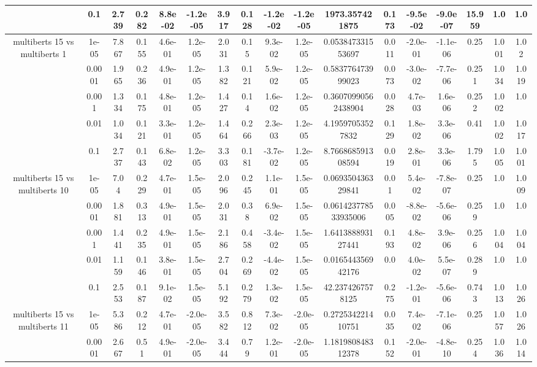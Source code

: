 \begin{tabular}{|c|c|c|c|c|c|c|c|c|c|c|c|c|c|c|c|c|}
 & 0.1 & 2.739 & 0.282 & 8.8e-02 & -1.2e-05 & 3.917 & 0.128 & -1.2e-02 & -1.2e-05 & 1973.357421875 & 0.173 & -9.5e-02 & -9.0e-07 & 15.959 & 1.0 & 1.0 \\
\hline
\multirow{5}{*}{multiberts 15 vs multiberts 1} & 1e-05 & 7.867 & 0.155 & 4.6e-01 & 1.2e-05 & 2.031 & 0.15 & 9.3e-02 & 1.2e-05 & 0.053847331553697 & 0.011 & -2.0e-01 & -1.1e-06 & 0.25 & 1.001 & 1.02 \\
 & 0.0001 & 1.965 & 0.236 & 4.9e-01 & 1.2e-05 & 1.382 & 0.121 & 5.9e-02 & 1.2e-05 & 0.583776473999023 & 0.073 & -3.0e-02 & -7.7e-06 & 0.251 & 1.034 & 1.019 \\
 & 0.001 & 1.334 & 0.175 & 4.8e-01 & 1.2e-05 & 1.427 & 0.14 & 1.6e-02 & 1.2e-05 & 0.36070990562438904 & 0.028 & 4.7e-03 & 1.6e-06 & 0.252 & 1.002 & 1.0 \\
 & 0.01 & 1.034 & 0.121 & 3.3e-01 & 1.2e-05 & 1.464 & 0.266 & 2.3e-03 & 1.2e-05 & 4.19597053527832 & 0.129 & 1.8e-02 & 3.3e-06 & 0.41 & 1.002 & 1.017 \\
 & 0.1 & 2.737 & 0.143 & 6.8e-02 & 1.2e-05 & 3.303 & 0.181 & -3.7e-02 & 1.2e-05 & 8.766868591308594 & 0.019 & 2.8e-01 & 3.3e-06 & 1.795 & 1.005 & 1.001 \\
\hline
\multirow{5}{*}{multiberts 15 vs multiberts 10} & 1e-05 & 7.04 & 0.229 & 4.7e-01 & 1.5e-05 & 2.096 & 0.245 & 1.1e-01 & 1.5e-05 & 0.069350436329841 & 0.01 & 5.4e-02 & -7.8e-07 & 0.25 & 1.0 & 1.009 \\
 & 0.0001 & 1.881 & 0.313 & 4.9e-01 & 1.5e-05 & 2.031 & 0.38 & 6.9e-02 & 1.5e-05 & 0.061423778533935006 & 0.005 & -8.8e-02 & -5.6e-06 & 0.259 & 1.0 & 1.0 \\
 & 0.001 & 1.441 & 0.235 & 4.9e-01 & 1.5e-05 & 2.186 & 0.458 & -3.4e-02 & 1.5e-05 & 1.641388893127441 & 0.193 & 4.8e-02 & 3.9e-06 & 0.256 & 1.004 & 1.004 \\
 & 0.01 & 1.159 & 0.146 & 3.8e-01 & 1.5e-05 & 2.704 & 0.269 & -4.4e-02 & 1.5e-05 & 0.016544356942176 & 0.0 & 4.0e-02 & 5.5e-07 & 0.289 & 1.0 & 1.0 \\
 & 0.1 & 2.553 & 0.187 & 9.1e-02 & 1.5e-05 & 5.192 & 0.279 & 1.3e-02 & 1.5e-05 & 42.2374267578125 & 0.275 & -1.2e-01 & -5.6e-06 & 0.743 & 1.013 & 1.026 \\
\hline
\multirow{5}{*}{multiberts 15 vs multiberts 11} & 1e-05 & 5.386 & 0.212 & 4.7e-01 & -2.0e-05 & 3.582 & 0.812 & 7.3e-02 & -2.0e-05 & 0.272534221410751 & 0.035 & 7.4e-02 & -7.1e-06 & 0.25 & 1.057 & 1.026 \\
 & 0.0001 & 2.667 & 0.51 & 4.9e-01 & -2.0e-05 & 3.444 & 0.79 & 1.2e-01 & -2.0e-05 & 1.181980848312378 & 0.152 & -2.0e-01 & -4.8e-10 & 0.254 & 1.036 & 1.014 \\

\end{tabular}
